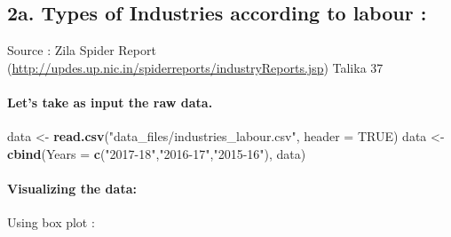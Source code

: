 \documentclass[]{article}
\newenvironment{Shaded}{\begin{snugshade}}{\end{snugshade}}
\newcommand{\KeywordTok}[1]{\textcolor[rgb]{0.13,0.29,0.53}{\textbf{#1}}}
\newcommand{\DataTypeTok}[1]{\textcolor[rgb]{0.13,0.29,0.53}{#1}}
\newcommand{\StringTok}[1]{\textcolor[rgb]{0.31,0.60,0.02}{#1}}
\newcommand{\OtherTok}[1]{\textcolor[rgb]{0.56,0.35,0.01}{#1}}
\newcommand{\NormalTok}[1]{#1}
\let\oldparagraph\paragraph
\renewcommand{\paragraph}[1]{\oldparagraph{#1}\mbox{}}
\begin{document}
\subsection{2a. Types of Industries according to labour
:}\label{a.-types-of-industries-according-to-labour}

Source : Zila Spider Report
(\url{http://updes.up.nic.in/spiderreports/industryReports.jsp}) Talika
37

\paragraph{Let's take as input the raw
data.}\label{lets-take-as-input-the-raw-data.-1}

\begin{Shaded}
\begin{Highlighting}[]
\NormalTok{data <-}\StringTok{ }\KeywordTok{read.csv}\NormalTok{(}\StringTok{"data_files/industries_labour.csv"}\NormalTok{, }\DataTypeTok{header =} \OtherTok{TRUE}\NormalTok{)}
\NormalTok{data <-}\StringTok{ }\KeywordTok{cbind}\NormalTok{(}\DataTypeTok{Years =} \KeywordTok{c}\NormalTok{(}\StringTok{"2017-18"}\NormalTok{,}\StringTok{"2016-17"}\NormalTok{,}\StringTok{"2015-16"}\NormalTok{), data)}
\end{Highlighting}
\end{Shaded}

\paragraph{Visualizing the data:}\label{visualizing-the-data-1}

Using box plot :
\end{document}

